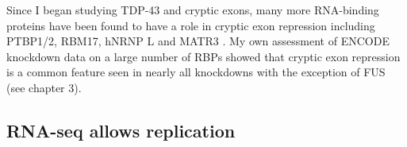 Since I began studying TDP-43 and cryptic exons, many more RNA-binding proteins have been found to have a role in cryptic exon repression including PTBP1/2, RBM17, hNRNP L and MATR3 \citep{	Ling2016,Tan2016,McClory2018,Attig2018}. 
My own assessment of ENCODE knockdown data on a large number of RBPs showed that cryptic exon repression is a common feature seen in nearly all knockdowns with the exception of FUS (see chapter 3). 




\subsection{RNA-seq allows replication}





